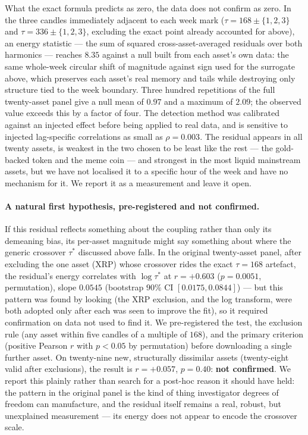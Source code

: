 \documentclass[aps,pre,twocolumn,superscriptaddress,floatfix,nofootinbib]{revtex4-2}
\begin{document}
What the exact formula predicts as zero, the data does not confirm as zero.
In the three candles immediately adjacent to each week mark
($\tau=168\pm\{1,2,3\}$ and $\tau=336\pm\{1,2,3\}$, excluding the exact point
already accounted for above), an energy statistic --- the sum of squared
cross-asset-averaged residuals over both harmonics --- reaches $8.35$ against
a null built from each asset's own data: the same whole-week circular shift of
magnitude against sign used for the surrogate above, which preserves each
asset's real memory and tails while destroying only structure tied to the
week boundary. Three hundred repetitions of the full twenty-asset panel give a
null mean of $0.97$ and a maximum of $2.09$; the observed value exceeds this
by a factor of four. The detection method was calibrated against an injected
effect before being applied to real data, and is sensitive to injected
lag-specific correlations as small as $\rho=0.003$. The residual appears in
all twenty assets, is weakest in the two chosen to be least like the rest ---
the gold-backed token and the meme coin --- and strongest in the most liquid
mainstream assets, but we have not localised it to a specific hour of the
week and have no mechanism for it. We report it as a measurement and leave it
open.

\paragraph*{A natural first hypothesis, pre-registered and not confirmed.}
If this residual reflects something about the coupling rather than only its
demeaning bias, its per-asset magnitude might say something about where the
generic crossover $\tau^{*}$ discussed above falls. In the original
twenty-asset panel, after excluding the one asset (XRP) whose crossover rides
the exact $\tau=168$ artefact, the residual's energy correlates with
$\log\tau^{*}$ at $r=+0.603$ ($p=0.0051$, permutation), slope $0.0545$
(bootstrap $90\%$ CI $[0.0175,0.0844]$) --- but this pattern was found by
looking (the XRP exclusion, and the log transform, were both adopted only
after each was seen to improve the fit), so it required confirmation on data
not used to find it. We pre-registered the test, the exclusion rule (any
asset within five candles of a multiple of $168$), and the primary criterion
(positive Pearson $r$ with $p<0.05$ by permutation) before downloading a
single further asset. On twenty-nine new, structurally dissimilar assets
(twenty-eight valid after exclusions), the result is $r=+0.057$, $p=0.40$:
\textbf{not confirmed}. We report this plainly rather than search for a
post-hoc reason it should have held: the pattern in the original panel is the
kind of thing investigator degrees of freedom can manufacture, and the
residual itself remains a real, robust, but unexplained measurement --- its
energy does not appear to encode the crossover scale.
\end{document}
